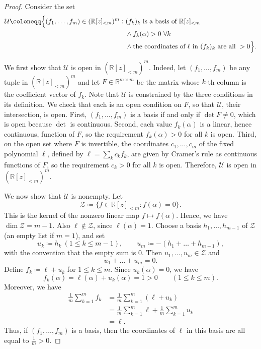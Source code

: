 \documentclass[11pt, a4paper]{article}
\theoremstyle{plain}
\theoremstyle{definition}
\newcommand{\R}{\mathbb{R}}
\newcommand{\PP}{\R[z]_{<m}}
\newcommand{\defas}{\coloneqq}
\begin{document}
\begin{proof}
Consider the set
\begin{align*}
\mathcal U\defas \Bigl\{(f_1,\dots,f_m)\in(\PP)^m:\ &(f_k)_k\text{ is a basis of }\PP\\
&\land f_k(\alpha)>0\ \forall k\\
&\land \text{the coordinates of }\ell\text{ in }(f_k)_k\text{ are all }>0\Bigr\}.
\end{align*}

We first show that $\mathcal U$ is open in $(\PP)^m$.
Indeed, let $(f_1,\dots,f_m)$ be any tuple in $(\PP)^m$ and let $F\in\R^{m\times m}$ be the matrix whose $k$-th column is the coefficient vector of $f_k$.
Note that $\mathcal U$ is constrained by the three conditions in its definition.
We check that each is an open condition on $F$, so that $\mathcal U$, their intersection, is open.
First, $(f_1,\dots,f_m)$ is a basis if and only if $\det F\neq0$, which is open because $\det$ is continuous.
Second, each value $f_k(\alpha)$ is a linear, hence continuous, function of $F$, so the requirement $f_k(\alpha)>0$ for all $k$ is open.
Third, on the open set where $F$ is invertible, the coordinates $c_1,\dots,c_m$ of the fixed polynomial $\ell$, defined by $\ell=\sum_kc_kf_k$, are given by Cramer's rule as continuous functions of $F$, so the requirement $c_k>0$ for all $k$ is open.
Therefore, $\mathcal U$ is open in $(\PP)^m$.

We now show that $\mathcal U$ is nonempty. Let
\[
\mathcal Z\defas \{f\in\PP:f(\alpha)=0\}.
\]
This is the kernel of the nonzero linear map $f\mapsto f(\alpha)$. Hence, we have
$\dim\mathcal Z=m-1$. Also $\ell\notin\mathcal Z$, since $\ell(\alpha)=1$.
Choose a basis $h_1,\dots,h_{m-1}$ of $\mathcal Z$ (an empty list if $m=1$), and set
\[
u_k\defas h_k\ (1\leq k\leq m-1),
\qquad
u_m\defas -(h_1+\dots+h_{m-1}),
\]
with the convention that the empty sum is $0$. Then $u_1,\dots,u_m\in\mathcal Z$ and
\[
u_1+\dots+u_m=0.
\]
Define $f_k\defas \ell+u_k$ for $1\leq k\leq m$. Since $u_k(\alpha) = 0$, we have
\[
f_k(\alpha)=\ell(\alpha)+u_k(\alpha)=1>0
\qquad(1\leq k\leq m).
\]
Moreover, we have
\begin{align*}
    \frac1m\sum_{k=1}^mf_k &= \frac1m\sum_{k=1}^m(\ell+u_k)\\
    &= \frac1m\sum_{k=1}^m\ell + \frac1m\sum_{k=1}^mu_k\\
    &= \ell .
\end{align*}
Thus, if $(f_1,\dots,f_m)$ is a basis, then the coordinates of $\ell$ in this basis are all equal to $\frac1m>0$.


\end{proof}
\end{document}

